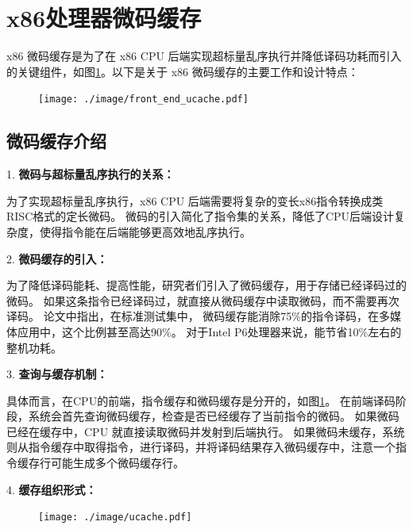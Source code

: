 \section{x86处理器微码缓存}\label{sec:complex_isa}

x86 微码缓存是为了在 x86 CPU 后端实现超标量乱序执行并降低译码功耗而引入的关键组件\cite{solomonMicrooperationCachePower2001}，如图\ref{img:front_end_ucache}。以下是关于 x86 微码缓存的主要工作和设计特点：

\begin{figure}[!htbp]
  \centering
  \texttt{[image: ./image/front\_end\_ucache.pdf]}
  \label{img:front_end_ucache}
\end{figure}

\subsection{微码缓存介绍}

1. \textbf{微码与超标量乱序执行的关系：}

为了实现超标量乱序执行，x86 CPU 后端需要将复杂的变长x86指令转换成类RISC格式的定长微码。
微码的引入简化了指令集的关系，降低了CPU后端设计复杂度，使得指令能在后端能够更高效地乱序执行。

2. \textbf{微码缓存的引入：}

为了降低译码能耗、提高性能，研究者们引入了微码缓存，用于存储已经译码过的微码。
如果这条指令已经译码过，就直接从微码缓存中读取微码，而不需要再次译码。
\cite{solomonMicrooperationCachePower2001}论文中指出，在标准测试集中，
微码缓存能消除75\%的指令译码，在多媒体应用中，这个比例甚至高达90\%。
对于Intel P6处理器来说，能节省10\%左右的整机功耗。

3. \textbf{查询与缓存机制：}

具体而言，在CPU的前端，指令缓存和微码缓存是分开的，如图\ref{img:front_end_ucache}。
在前端译码阶段，系统会首先查询微码缓存，检查是否已经缓存了当前指令的微码。
如果微码已经在缓存中，CPU 就直接读取微码并发射到后端执行。
如果微码未缓存，系统则从指令缓存中取得指令，进行译码，并将译码结果存入微码缓存中，注意一个指令缓存行可能生成多个微码缓存行。

4. \textbf{缓存组织形式：}

\begin{figure}[!htbp]
  \centering
  \texttt{[image: ./image/ucache.pdf]}
  \label{img:ucache}
\end{figure}

